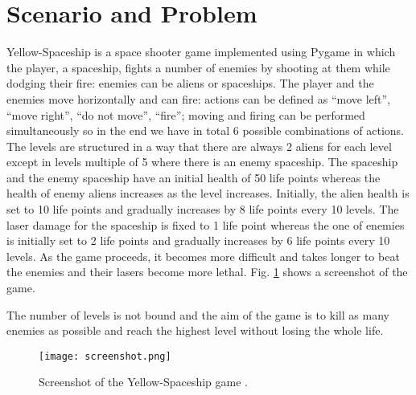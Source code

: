\section{Scenario and Problem}
Yellow-Spaceship \cite{Yellow-Spaceship} is a space shooter game implemented using Pygame \cite{PyGame} in which the
player, a spaceship, fights a number of enemies by shooting at them while dodging their fire:
enemies can be aliens or spaceships. The player and the enemies move horizontally and
can fire: actions can be defined as “move left”, “move right”, “do not move”, “fire”; moving
and firing can be performed simultaneously so in the end we have in total 6 possible
combinations of actions. The levels are structured in a way that there are always 2 aliens for
each level except in levels multiple of 5 where there is an enemy spaceship. The spaceship
and the enemy spaceship have an initial health of 50 life points whereas the health of enemy
aliens increases as the level increases. Initially, the alien health is set to 10 life points and
gradually increases by 8 life points every 10 levels. The laser damage for the spaceship is
fixed to 1 life point whereas the one of enemies is initially set to 2 life points and gradually
increases by 6 life points every 10 levels. As the game proceeds, it becomes more difficult
and takes longer to beat the enemies and their lasers become more lethal. Fig. \ref{fig:game_screenshot} shows a
screenshot of the game.

The number of levels is not bound and the aim of the game is to kill as many enemies as
possible and reach the highest level without losing the whole life.

\begin{figure}[ht]
\centerline{\texttt{[image: screenshot.png]}}
\caption{Screenshot of the Yellow-Spaceship game \cite{Yellow-Spaceship}.}
\label{fig:game_screenshot}
\end{figure}
